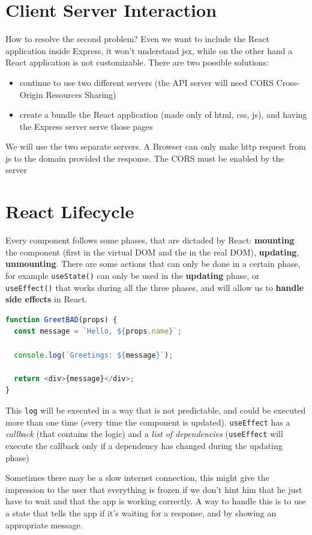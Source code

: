 \documentclass[12pt]{article}
\begin{document}
\section{Client Server Interaction}
How to resolve the second problem? Even we want to include the React application inside Express, it won't understand jsx, while on the other hand a React application is not customizable. There are two possible solutions:
\begin{itemize}
  \item continue to use two different servers (the API server will need CORS Cross-Origin Resources Sharing)
  \item create a bundle the React application (made only of html, css, js), and having the Express server serve those pages
\end{itemize}
We will use the two separate servers. A Browser can only make http request from js to the domain provided the response. The CORS must be enabled by the server



\section{React Lifecycle}
Every component follows some phases, that are dictaded by React: \textbf{mounting} the component (first in the virtual DOM and the in the real DOM), \textbf{updating}, \textbf{unmounting}. There are some actions that can only be done in a certain phase, for example \texttt{useState()} can only be used in the \textbf{updating} phase, or \texttt{useEffect()} that works during all the three phases, and will allow us to \textbf{handle side effects} in React.
\begin{lstlisting}[language=js]
function GreetBAD(props) {
  const message = `Hello, ${props.name}`;

  console.log(`Greetings: ${message}`);

  return <div>{message}</div>;
}
\end{lstlisting}
This \texttt{log} will be executed in a way that is not predictable, and could be executed more than one time (every time the component is updated). \texttt{useEffect} has a \emph{callback} (that contains the logic) and a \emph{list of dependencies} (\texttt{useEffect} will execute the callback only if a dependency has changed during the updating phase)
 
Sometimes there may be a slow internet connection, this might give the impression to the user that everything is frozen if we don't hint him that he just have to wait and that the app is working correctly. A way to handle this is to use a state that tells the app if it's waiting for a response, and by showing an appropriate message.
\end{document}
